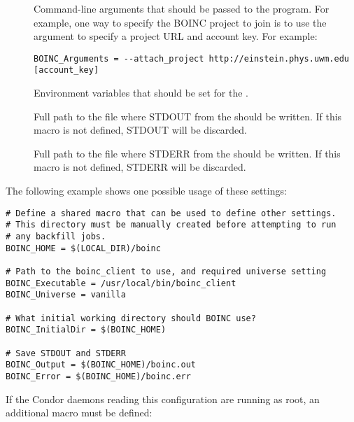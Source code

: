 \begin{description}

\item[] \label{param:BoincArguments}
  Command-line arguments that should be passed to the
   program.
  For example, one way to specify the BOINC project to join is to use 
  the  argument to specify a project URL and
  account key.
  For example:

\footnotesize
\begin{verbatim}
BOINC_Arguments = --attach_project http://einstein.phys.uwm.edu [account_key] 
\end{verbatim}
\normalsize

\item[] \label{param:BoincEnvironment}
  Environment variables that should be set for the
  .

\item[] \label{param:BoincOutput} Full path to
  the file where STDOUT from the  should be
  written.
  If this macro is not defined, STDOUT will be discarded.

\item[] \label{param:BoincError} Full path to
  the file where STDERR from the  should be
  written.
  If this macro is not defined, STDERR will be discarded.

\end{description}


The following example shows one possible usage of these settings:

\footnotesize
\begin{verbatim}
# Define a shared macro that can be used to define other settings.
# This directory must be manually created before attempting to run
# any backfill jobs.
BOINC_HOME = $(LOCAL_DIR)/boinc

# Path to the boinc_client to use, and required universe setting
BOINC_Executable = /usr/local/bin/boinc_client
BOINC_Universe = vanilla

# What initial working directory should BOINC use?
BOINC_InitialDir = $(BOINC_HOME)

# Save STDOUT and STDERR
BOINC_Output = $(BOINC_HOME)/boinc.out
BOINC_Error = $(BOINC_HOME)/boinc.err
\end{verbatim}
\normalsize

If the Condor daemons reading this configuration are running as root,
an additional macro must be defined:

